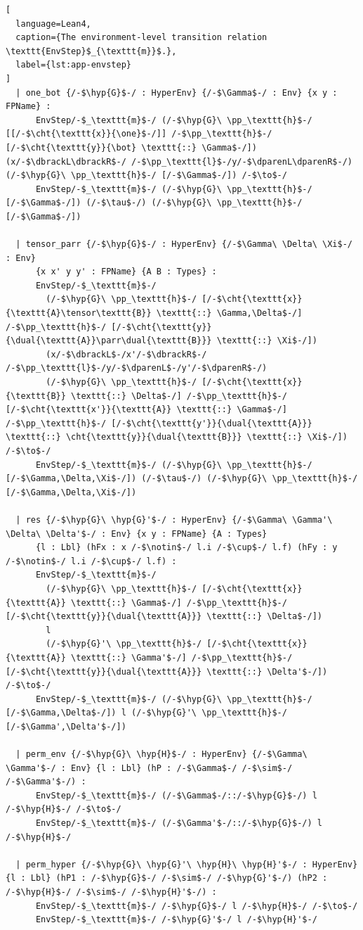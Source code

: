 \begin{lstlisting}[
  language=Lean4,
  caption={The environment-level transition relation \texttt{EnvStep}$_{\texttt{m}}$.},
  label={lst:app-envstep}
]
  | one_bot {/-$\hyp{G}$-/ : HyperEnv} {/-$\Gamma$-/ : Env} {x y : FPName} :
      EnvStep/-$_\texttt{m}$-/ (/-$\hyp{G}\ \pp_\texttt{h}$-/ [[/-$\cht{\texttt{x}}{\one}$-/]] /-$\pp_\texttt{h}$-/ [/-$\cht{\texttt{y}}{\bot} \texttt{::} \Gamma$-/]) (x/-$\dbrackL\dbrackR$-/ /-$\pp_\texttt{l}$-/y/-$\dparenL\dparenR$-/) (/-$\hyp{G}\ \pp_\texttt{h}$-/ [/-$\Gamma$-/]) /-$\to$-/
      EnvStep/-$_\texttt{m}$-/ (/-$\hyp{G}\ \pp_\texttt{h}$-/ [/-$\Gamma$-/]) (/-$\tau$-/) (/-$\hyp{G}\ \pp_\texttt{h}$-/ [/-$\Gamma$-/])

  | tensor_parr {/-$\hyp{G}$-/ : HyperEnv} {/-$\Gamma\ \Delta\ \Xi$-/ : Env}
      {x x' y y' : FPName} {A B : Types} :
      EnvStep/-$_\texttt{m}$-/ 
        (/-$\hyp{G}\ \pp_\texttt{h}$-/ [/-$\cht{\texttt{x}}{\texttt{A}\tensor\texttt{B}} \texttt{::} \Gamma,\Delta$-/] /-$\pp_\texttt{h}$-/ [/-$\cht{\texttt{y}}{\dual{\texttt{A}}\parr\dual{\texttt{B}}} \texttt{::} \Xi$-/]) 
        (x/-$\dbrackL$-/x'/-$\dbrackR$-/ /-$\pp_\texttt{l}$-/y/-$\dparenL$-/y'/-$\dparenR$-/) 
        (/-$\hyp{G}\ \pp_\texttt{h}$-/ [/-$\cht{\texttt{x}}{\texttt{B}} \texttt{::} \Delta$-/] /-$\pp_\texttt{h}$-/ [/-$\cht{\texttt{x'}}{\texttt{A}} \texttt{::} \Gamma$-/] /-$\pp_\texttt{h}$-/ [/-$\cht{\texttt{y'}}{\dual{\texttt{A}}} \texttt{::} \cht{\texttt{y}}{\dual{\texttt{B}}} \texttt{::} \Xi$-/]) /-$\to$-/
      EnvStep/-$_\texttt{m}$-/ (/-$\hyp{G}\ \pp_\texttt{h}$-/ [/-$\Gamma,\Delta,\Xi$-/]) (/-$\tau$-/) (/-$\hyp{G}\ \pp_\texttt{h}$-/ [/-$\Gamma,\Delta,\Xi$-/])

  | res {/-$\hyp{G}\ \hyp{G}'$-/ : HyperEnv} {/-$\Gamma\ \Gamma'\ \Delta\ \Delta'$-/ : Env} {x y : FPName} {A : Types} 
      {l : Lbl} (hFx : x /-$\notin$-/ l.i /-$\cup$-/ l.f) (hFy : y /-$\notin$-/ l.i /-$\cup$-/ l.f) :
      EnvStep/-$_\texttt{m}$-/
        (/-$\hyp{G}\ \pp_\texttt{h}$-/ [/-$\cht{\texttt{x}}{\texttt{A}} \texttt{::} \Gamma$-/] /-$\pp_\texttt{h}$-/ [/-$\cht{\texttt{y}}{\dual{\texttt{A}}} \texttt{::} \Delta$-/])
        l
        (/-$\hyp{G}'\ \pp_\texttt{h}$-/ [/-$\cht{\texttt{x}}{\texttt{A}} \texttt{::} \Gamma'$-/] /-$\pp_\texttt{h}$-/ [/-$\cht{\texttt{y}}{\dual{\texttt{A}}} \texttt{::} \Delta'$-/]) /-$\to$-/
      EnvStep/-$_\texttt{m}$-/ (/-$\hyp{G}\ \pp_\texttt{h}$-/ [/-$\Gamma,\Delta$-/]) l (/-$\hyp{G}'\ \pp_\texttt{h}$-/ [/-$\Gamma',\Delta'$-/])

  | perm_env {/-$\hyp{G}\ \hyp{H}$-/ : HyperEnv} {/-$\Gamma\ \Gamma'$-/ : Env} {l : Lbl} (hP : /-$\Gamma$-/ /-$\sim$-/ /-$\Gamma'$-/) :
      EnvStep/-$_\texttt{m}$-/ (/-$\Gamma$-/::/-$\hyp{G}$-/) l /-$\hyp{H}$-/ /-$\to$-/
      EnvStep/-$_\texttt{m}$-/ (/-$\Gamma'$-/::/-$\hyp{G}$-/) l /-$\hyp{H}$-/

  | perm_hyper {/-$\hyp{G}\ \hyp{G}'\ \hyp{H}\ \hyp{H}'$-/ : HyperEnv} {l : Lbl} (hP1 : /-$\hyp{G}$-/ /-$\sim$-/ /-$\hyp{G}'$-/) (hP2 : /-$\hyp{H}$-/ /-$\sim$-/ /-$\hyp{H}'$-/) :
      EnvStep/-$_\texttt{m}$-/ /-$\hyp{G}$-/ l /-$\hyp{H}$-/ /-$\to$-/
      EnvStep/-$_\texttt{m}$-/ /-$\hyp{G}'$-/ l /-$\hyp{H}'$-/
\end{lstlisting}

